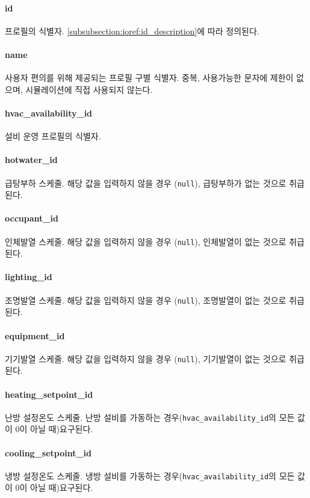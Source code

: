 \paragraph{id} 프로필의 식별자. \ref{subsubsection:ioref:id_description}에 따라 정의된다.

\paragraph{name} 사용자 편의를 위해 제공되는 프로필 구별 식별자. 중복, 사용가능한 문자에 제한이 없으며, 시뮬레이션에 직접 사용되지 않는다.

\paragraph{hvac\_availability\_id} 설비 운영 프로필의 식별자.

\paragraph{hotwater\_id} 급탕부하 스케줄. 해당 값을 입력하지 않을 경우 (\texttt{null}), 급탕부하가 없는 것으로 취급된다.

\paragraph{occupant\_id} 인체발열 스케줄. 해당 값을 입력하지 않을 경우 (\texttt{null}), 인체발열이 없는 것으로 취급된다.

\paragraph{lighting\_id} 조명발열 스케줄. 해당 값을 입력하지 않을 경우 (\texttt{null}), 조명발열이 없는 것으로 취급된다.

\paragraph{equipment\_id} 기기발열 스케줄. 해당 값을 입력하지 않을 경우 (\texttt{null}), 기기발열이 없는 것으로 취급된다.

\paragraph{heating\_setpoint\_id} 난방 설정온도 스케줄. 난방 설비를 가동하는 경우(\texttt{hvac\_availability\_id}의 모든 값이 0이 아닐 때)요구된다.

\paragraph{cooling\_setpoint\_id} 냉방 설정온도 스케줄. 냉방 설비를 가동하는 경우(\texttt{hvac\_availability\_id}의 모든 값이 0이 아닐 때)요구된다.

